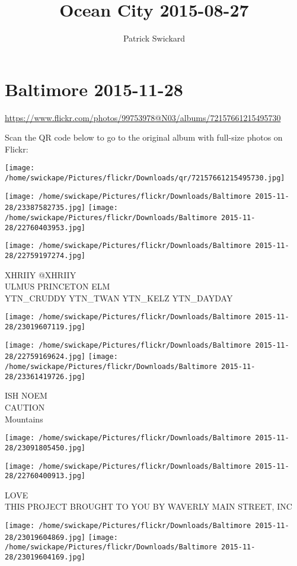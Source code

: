 \documentclass[10pt,letterpaper]{article}
\title{Ocean City 2015-08-27}
\author{Patrick Swickard}
\date{}
\begin{document}
\section*{Baltimore 2015-11-28}

\url{https://www.flickr.com/photos/99753978@N03/albums/72157661215495730}

Scan the QR code below to go to the original album with full-size photos on Flickr:

\texttt{[image: /home/swickape/Pictures/flickr/Downloads/qr/72157661215495730.jpg]}
\pagebreak

\texttt{[image: /home/swickape/Pictures/flickr/Downloads/Baltimore 2015-11-28/23387582735.jpg]}
\texttt{[image: /home/swickape/Pictures/flickr/Downloads/Baltimore 2015-11-28/22760403953.jpg]}

\texttt{[image: /home/swickape/Pictures/flickr/Downloads/Baltimore 2015-11-28/22759197274.jpg]}

XHRIIY @XHRIIY\\
ULMUS PRINCETON ELM\\
YTN\_CRUDDY YTN\_TWAN YTN\_KELZ YTN\_DAYDAY
\pagebreak

\texttt{[image: /home/swickape/Pictures/flickr/Downloads/Baltimore 2015-11-28/23019607119.jpg]}

\vspace{0.25in}
\texttt{[image: /home/swickape/Pictures/flickr/Downloads/Baltimore 2015-11-28/22759169624.jpg]}
\texttt{[image: /home/swickape/Pictures/flickr/Downloads/Baltimore 2015-11-28/23361419726.jpg]}

ISH NOEM\\
CAUTION\\
Mountains
\pagebreak

\texttt{[image: /home/swickape/Pictures/flickr/Downloads/Baltimore 2015-11-28/23091805450.jpg]}

\vspace{0.25in}
\texttt{[image: /home/swickape/Pictures/flickr/Downloads/Baltimore 2015-11-28/22760400913.jpg]}

LOVE\\
THIS PROJECT BROUGHT TO YOU BY WAVERLY MAIN STREET, INC
\pagebreak

\texttt{[image: /home/swickape/Pictures/flickr/Downloads/Baltimore 2015-11-28/23019604869.jpg]}
\texttt{[image: /home/swickape/Pictures/flickr/Downloads/Baltimore 2015-11-28/23019604169.jpg]}
\end{document}
